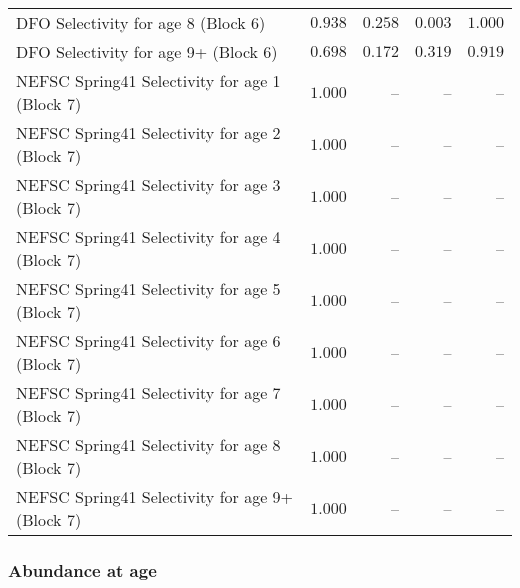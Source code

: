 \documentclass[
]{article}
\begin{document}
\begin{landscape}
\begin{longtable}[t]{lrrrr}
DFO Selectivity for age 8 (Block 6) & $0.938$ & $0.258$ & $0.003$ & $1.000$\\
DFO Selectivity for age 9+ (Block 6) & $0.698$ & $0.172$ & $0.319$ & $0.919$\\
\addlinespace
NEFSC Spring41 Selectivity for age 1 (Block 7) & $1.000$ & -- & -- & --\\
NEFSC Spring41 Selectivity for age 2 (Block 7) & $1.000$ & -- & -- & --\\
NEFSC Spring41 Selectivity for age 3 (Block 7) & $1.000$ & -- & -- & --\\
NEFSC Spring41 Selectivity for age 4 (Block 7) & $1.000$ & -- & -- & --\\
NEFSC Spring41 Selectivity for age 5 (Block 7) & $1.000$ & -- & -- & --\\
\addlinespace
NEFSC Spring41 Selectivity for age 6 (Block 7) & $1.000$ & -- & -- & --\\
NEFSC Spring41 Selectivity for age 7 (Block 7) & $1.000$ & -- & -- & --\\
NEFSC Spring41 Selectivity for age 8 (Block 7) & $1.000$ & -- & -- & --\\
NEFSC Spring41 Selectivity for age 9+ (Block 7) & $1.000$ & -- & -- & --\\*
\end{longtable}
\end{landscape}

\subsubsection{Abundance at age}\label{abundance-at-age}
\end{document}
